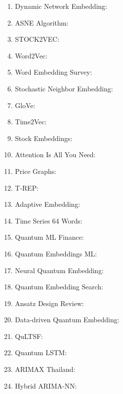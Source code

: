 \documentclass[11pt,a4paper]{article}
\begin{document}
\begin{enumerate}
    \item Dynamic Network Embedding: \cite{dynamic_network_embedding_survey}
    \item ASNE Algorithm: \cite{asne_social_network}
    \item STOCK2VEC: \cite{stock2vec}
    \item Word2Vec: \cite{word2vec}
    \item Word Embedding Survey: \cite{word_embedding_survey}
    \item Stochastic Neighbor Embedding: \cite{stochastic_neighbor_embedding}
    \item GloVe: \cite{glove}
    \item Time2Vec: \cite{time2vec}
    \item Stock Embeddings: \cite{stock_embeddings}
    \item Attention Is All You Need: \cite{attention_is_all_you_need}
    \item Price Graphs: \cite{price_graphs}
    \item T-REP: \cite{trep}
    \item Adaptive Embedding: \cite{adaptive_embedding}
    \item Time Series 64 Words: \cite{timeseries_64words}
    \item Quantum ML Finance: \cite{quantum_ml_finance}
    \item Quantum Embeddings ML: \cite{quantum_embeddings_ml}
    \item Neural Quantum Embedding: \cite{neural_quantum_embedding}
    \item Quantum Embedding Search: \cite{quantum_embedding_search}
    \item Ansatz Design Review: \cite{ansatz_design_review}
    \item Data-driven Quantum Embedding: \cite{data_driven_quantum_embedding}
    \item QuLTSF: \cite{qultsf}
    \item Quantum LSTM: \cite{quantum_lstm}
    \item ARIMAX Thailand: \cite{arimax_thailand}
    \item Hybrid ARIMA-NN: \cite{hybrid_arima_nn}
\end{enumerate}

\printbibliography[title=Complete Bibliography]
\end{document}
